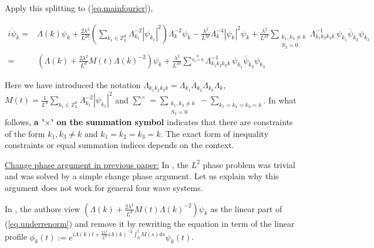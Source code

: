 Apply this splitting to (\ref{eq.mainfourier}),

\begin{equation}\label{eq.underrenorm}
\begin{split}
i \dot{\psi}_{k} =& \Lambda(k) \psi_k
+\frac{2\lambda^2}{L^{2d}} \left(\sum\limits_{k_1\in \mathbb{Z}^d_L} \Lambda_{k_1}^{-2}|\psi_{k_1}|^2 \right) \Lambda_{k}^{-2}\psi_{k}
-\frac{\lambda^2}{L^{2d}} \Lambda_{k}^{-4}|\psi_{k}|^2 \psi_{k}
+\frac{\lambda^2}{L^{2d}} \sum\limits_{\substack{k_1, k_3\neq k \\ S_3=0}} \Lambda_{k_1k_2k_3k}^{-1}\,\psi_{k_1}\overline{\psi}_{k_2} \psi_{k_3}
\\
=& \left(\Lambda(k)+\frac{2\lambda^2}{L^{d}} M(t)\Lambda(k)^{-2}\right) \psi_k
+\frac{\lambda^2}{L^{2d}} \sum^{\times}\limits_{S_3=0} \Lambda_{k_1k_2k_3k}^{-1}\,\psi_{k_1}\overline{\psi}_{k_2} \psi_{k_3}
\end{split}
\end{equation}

Here we have introduced the notation $\Lambda_{k_1k_2k_3k}=\Lambda_{k_1}\Lambda_{k_2}\Lambda_{k_3}\Lambda_{k}$, $M(t)=\frac{1}{L^{d}} \sum\limits_{k_1\in \mathbb{Z}^d_L} \Lambda_{k_1}^{-2}|\psi_{k_1}|^2$ and $\sum^{\times}=\sum\limits_{\substack{k_1, k_3\neq k \\ S_3=0}}-\sum_{k_1=k_2=k_3=k}$. In what follows, \textbf{a '$\times$' on the summation symbol} indicates that there are constraints of the form $k_1, k_3\neq k$ and $k_1=k_2=k_3=k$. The exact form of inequality constraints or equal summation indices depends on the context. 

\underline{Change phase argument in previous paper:} In \cite{deng2021derivation}, the $L^2$ phase problem was trivial and was solved by a simple change phase argument. Let us explain why this argument does not work for general four wave systems.

In \cite{deng2021derivation}, the authors view $\left(\Lambda(k)+\frac{2\lambda^2}{L^{d}} M(t)\Lambda(k)^{-2}\right) \psi_k$ as the linear part of (\ref{eq.underrenorm}) and remove it by rewriting the equation in term of the linear profile $\phi_k(t):= e^{i\Lambda(k) t+\frac{2\lambda^2}{L^{d}} i \Lambda(k)^{-2}\int^t_{0}M(s) ds} \psi_k(t)$.
 
